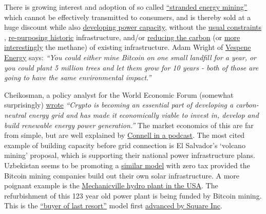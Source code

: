 There is growing interest and adoption of so called \href{https://www.bloomberg.com/news/articles/2022-06-01/oman-backs-u-s-firm-mining-crypto-to-cut-natural-gas-flaring}{``stranded energy mining''}  which cannot be effectively transmitted to consumers, and is thereby sold at a huge discount while also \href{https://www.renewableenergyworld.com/wind-power/900mw-wind-farm-to-power-bitcoin-mining-operation/}{developing power capacity}, without the \href{https://batcoinz.com/the-renewable-energy-cannot-happen-without-bitcoin-mining\%ef\%bf\%bc/}{usual constraints} \cite{bastian2021hedging}, \href{https://www.curbed.com/2021/07/crypto-currency-mining-old-power-plants.html}{re-purposing historic} infrastructure, and/or \href{https://www.bloomberg.com/news/articles/2022-03-24/exxon-considers-taking-gas-to-bitcoin-pilot-to-four-countries}{reducing the carbon} (or \href{https://batcoinz.com/quantifying-the-potential-impact-of-bitcoin-mining-on-global-methane-emissions-4/}{more interestingly} the methane) of existing infrastructure. Adam Wright of \href{https://vespene.energy/}{Vespene Energy} says: \textit{``You could either mine Bitcoin on one small landfill for a year, or you could plant 5 million trees and let them grow for 10 years - both of those are going to have the same environmental impact.''}\par
Cheikosman, a policy analyst for the World Economic Forum (somewhat surprisingly) \href{https://www.weforum.org/agenda/2022/03/crypto-energy-consumption/?}{wrote} \textit{``Crypto is becoming an essential part of developing a carbon-neutral energy grid and has made it economically viable to invest in, develop and build renewable energy power generation.''} 
The market economics of this are far from simple, but are well explained by \href{https://www.whatbitcoindid.com/podcast/bitcoin-energy-markets}{Connell in a podcast}. 
The most cited example of building capacity before grid connection is El Salvador's `volcano mining' proposal, which is supporting their national power infrastructure plans. Uzbekistan seems to be promoting a \href{https://www.reuters.com/business/finance/uzbekistan-legalises-solar-powered-crypto-mining-2022-05-04/}{similar model} with zero tax provided the Bitcoin mining companies build out their own solar infrastructure. A more poignant example is the \href{https://www.timesunion.com/news/article/Mechanicville-hydro-plant-gets-new-life-16299115.php}{Mechanicville hydro plant in the USA}. The refurbishment of this 123 year old power plant is being funded by Bitcoin mining. This is the \href{https://www.lynalden.com/bitcoin-energy/}{``buyer of last resort''} model first \href{https://squareup.com/us/en/press/bcei-white-paper}{advanced by Square Inc}.\par
